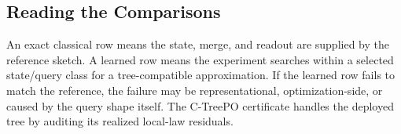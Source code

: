 \subsection{Reading the Comparisons}

An exact classical row means the state, merge, and readout are supplied by the
reference sketch. A learned row means the experiment searches within a selected
state/query class for a tree-compatible approximation. If the learned row fails
to match the reference, the failure may be representational, optimization-side,
or caused by the query shape itself. The C-TreePO certificate handles the
deployed tree by auditing its realized local-law residuals.

